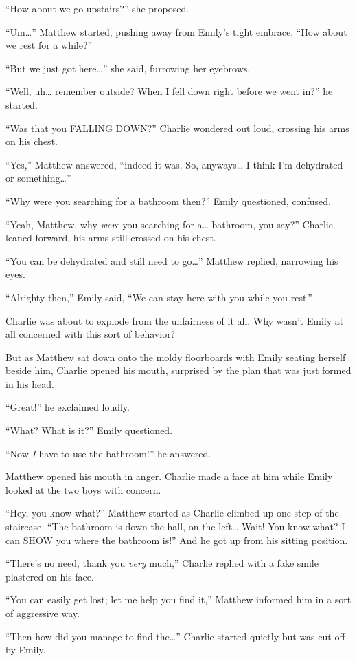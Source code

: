 “How about we go upstairs?” she proposed.

“Um…” Matthew started, pushing away from Emily's tight embrace, “How about we rest for a while?”

“But we just got here…” she said, furrowing her eyebrows.

“Well, uh… remember outside? When I fell down right before we went in?” he started.

“Was that you FALLING DOWN?” Charlie wondered out loud, crossing his arms on his chest.

“Yes,” Matthew answered, “indeed it was. So, anyways… I think I'm dehydrated or something…”

“Why were you searching for a bathroom then?” Emily questioned, confused.

“Yeah, Matthew, why \textit{were} you searching for a… bathroom, you say?” Charlie leaned forward, his arms still crossed on his chest.

“You can be dehydrated and still need to go…” Matthew replied, narrowing his eyes.

“Alrighty then,” Emily said, “We can stay here with you while you rest.”

Charlie was about to explode from the unfairness of it all. Why wasn't Emily at all concerned with this sort of behavior?

But as Matthew sat down onto the moldy floorboards with Emily seating herself beside him, Charlie opened his mouth, surprised by the plan that was just formed in his head.

“Great!” he exclaimed loudly.

“What? What is it?” Emily questioned.

“Now \textit{I} have to use the bathroom!” he answered.

Matthew opened his mouth in anger. Charlie made a face at him while Emily looked at the two boys with concern.

“Hey, you know what?” Matthew started as Charlie climbed up one step of the staircase, “The bathroom is down the hall, on the left… Wait! You know what? I can SHOW you where the bathroom is!” And he got up from his sitting position.

“There's no need, thank you \textit{very} much,” Charlie replied with a fake smile plastered on his face.

“You can easily get lost; let me help you find it,” Matthew informed him in a sort of aggressive way.

“Then how did you manage to find the…” Charlie started quietly but was cut off by Emily.

